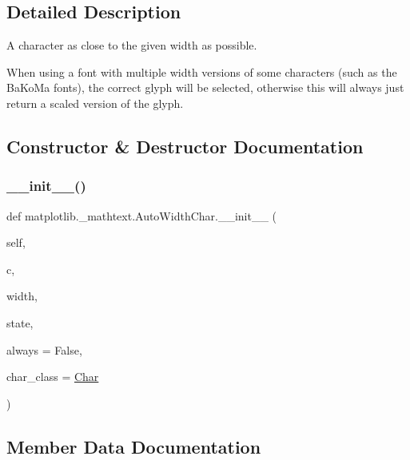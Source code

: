 \subsection{Detailed Description}
\begin{DoxyVerb}A character as close to the given width as possible.

When using a font with multiple width versions of some characters (such as
the BaKoMa fonts), the correct glyph will be selected, otherwise this will
always just return a scaled version of the glyph.
\end{DoxyVerb}
 

\subsection{Constructor \& Destructor Documentation}
\mbox{\label{classmatplotlib_1_1__mathtext_1_1AutoWidthChar_a3a543aae6f311fc3c0aed40105434288}} 
\subsubsection{\texorpdfstring{\+\_\+\+\_\+init\+\_\+\+\_\+()}{\_\_init\_\_()}}
{\footnotesize\ttfamily def matplotlib.\+\_\+mathtext.\+Auto\+Width\+Char.\+\_\+\+\_\+init\+\_\+\+\_\+ (\begin{DoxyParamCaption}\item[{}]{self,  }\item[{}]{c,  }\item[{}]{width,  }\item[{}]{state,  }\item[{}]{always = {\ttfamily False},  }\item[{}]{char\+\_\+class = {\ttfamily \hyperlink{classmatplotlib_1_1__mathtext_1_1Char}{Char}} }\end{DoxyParamCaption})}



\subsection{Member Data Documentation}
\mbox{\label{classmatplotlib_1_1__mathtext_1_1AutoWidthChar_a6b42e6b8008d91bc4f52bb7fc5b849a2}} 
